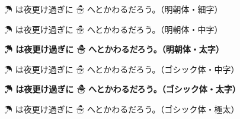 \documentclass[uplatex,a4paper]{jsarticle}
\begin{document}
{\mcfamily\ltseries ☂ は夜更け過ぎに ☃ へとかわるだろう。（明朝体・細字）}\par
{\mcfamily          ☂ は夜更け過ぎに ☃ へとかわるだろう。（明朝体・中字）}\par
{\mcfamily\bfseries ☂ は夜更け過ぎに ☃ へとかわるだろう。（明朝体・太字）}\par

{\gtfamily          ☂ は夜更け過ぎに ☃ へとかわるだろう。（ゴシック体・中字）}\par
{\gtfamily\bfseries ☂ は夜更け過ぎに ☃ へとかわるだろう。（ゴシック体・太字）}\par
{\gtfamily\ebseries ☂ は夜更け過ぎに ☃ へとかわるだろう。（ゴシック体・極太）}
\end{document}
